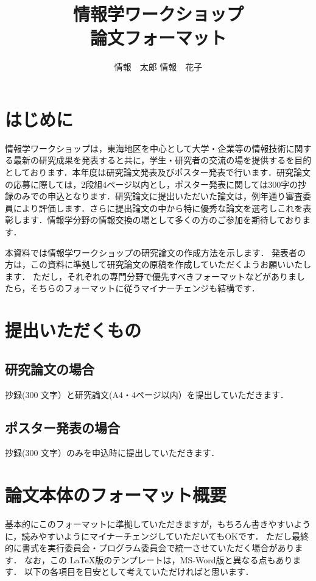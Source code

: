 \documentclass[a4j,8pt,twocolumn]{extarticle}
\title{情報学ワークショップ\\論文フォーマット}
\author{情報　太郎 \qquad 情報　花子}
\affiliation{情報大学情報学部}
\begin{document}
\section{はじめに}

情報学ワークショップは，東海地区を中心として大学・企業等の情報技術に関する最新の研究成果を発表すると共に，学生・研究者の交流の場を提供するを目的としております．本年度は研究論文発表及びポスター発表で行います．研究論文の応募に際しては，2段組4ページ以内とし，ポスター発表に関しては300字の抄録のみでの申込となります．研究論文に提出いただいた論文は，例年通り審査委員により評価します．さらに提出論文の中から特に優秀な論文を選考しこれを表彰します．情報学分野の情報交換の場として多くの方のご参加を期待しております．

本資料では情報学ワークショップの研究論文の作成方法を示します．
発表者の方は，この資料に準拠して研究論文の原稿を作成していただくようお願いいたします．
ただし，それぞれの専門分野で優先すべきフォーマットなどがありましたら，そちらのフォーマットに従うマイナーチェンジも結構です．


\section{提出いただくもの}
\subsection{研究論文の場合}
抄録(300 文字）と研究論文(A4・4ページ以内）を提出していただきます．

\subsection{ポスター発表の場合}
抄録(300 文字）のみを申込時に提出していただきます．

\section{論文本体のフォーマット概要}

基本的にこのフォーマットに準拠していただきますが，もちろん書きやすいように，読みやすいようにマイナーチェンジしていただいてもOKです．
ただし最終的に書式を実行委員会・プログラム委員会で統一させていただく場合があります．
なお，この \LaTeX 版のテンプレートは，MS-Word版と異なる点もあります．
以下の各項目を目安として考えていただければと思います．
\end{document}
